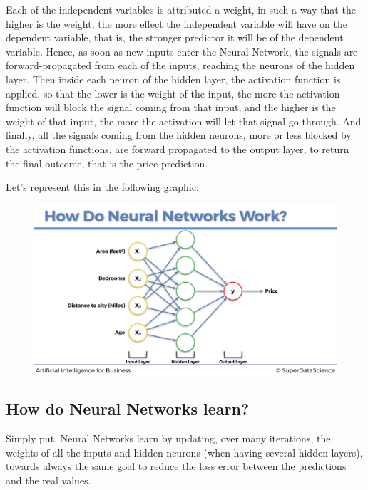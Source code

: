 \documentclass[]{book}
\begin{document}
Each of the independent variables is attributed a weight, in such a way that the higher is the weight, the more effect the independent variable will have on the dependent variable, that is, the stronger predictor it will be of the dependent variable. Hence, as soon as new inputs enter the Neural Network, the signals are forward-propagated from each of the inputs, reaching the neurons of the hidden layer. Then inside each neuron of the hidden layer, the activation function is applied, so that the lower is the weight of the input, the more the activation function will block the signal coming from that input, and the higher is the weight of that input, the more the activation will let that signal go through. And finally, all the signals coming from the hidden neurons, more or less blocked by the activation functions, are forward propagated to the output layer, to return the final outcome, that is the price prediction.

Let's represent this in the following graphic:

\begin{figure}[!htbp]
        \begin{center}
            \includegraphics[scale=0.18]{ANN_17.png}
        \end{center}
\end{figure}

\newpage

\subsection{How do Neural Networks learn?}

Simply put, Neural Networks learn by updating, over many iterations, the weights of all the inputs and hidden neurons (when having several hidden layers), towards always the same goal to reduce the loss error between the predictions and the real values.
\end{document}
